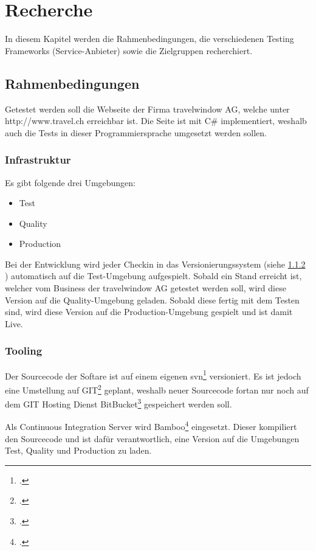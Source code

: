 \chapter{Recherche}

In diesem Kapitel werden die Rahmenbedingungen, die verschiedenen Testing Frameworks (Service-Anbieter) sowie die Zielgruppen recherchiert.

\section{Rahmenbedingungen}
\label{sec:Recherche:Rahmenbedingungen}
Getestet werden soll die Webseite der Firma travelwindow AG, welche unter http://www.travel.ch erreichbar ist. Die Seite ist mit C\# implementiert, weshalb auch die Tests in dieser Programmiersprache umgesetzt werden sollen.

\subsection{Infrastruktur}
\label{sec:Recherche:Rahmenbedingungen:Infrastruktur}
Es gibt folgende drei Umgebungen:
\begin{itemize}
\item Test
\item Quality
\item Production
\end{itemize}
Bei der Entwicklung wird jeder Checkin in das Versionierungssystem (siehe \cref{sec:Recherche:Rahmenbedingungen:Tooling} ) automatisch auf die Test-Umgebung aufgespielt. Sobald ein Stand erreicht ist, welcher vom Business der travelwindow AG getestet werden soll, wird diese Version auf die Quality-Umgebung geladen. Sobald diese fertig mit dem Testen sind, wird diese Version auf die Production-Umgebung gespielt und ist damit Live.

\subsection{Tooling}
\label{sec:Recherche:Rahmenbedingungen:Tooling}
Der Sourcecode der Softare ist auf einem eigenen \gls{svn}\footcite{Apache_Subversion_2015-07-26} versioniert. Es ist jedoch eine Umstellung auf GIT\footcite{Git_2015-07-26} geplant, weshalb neuer Sourcecode fortan nur noch auf dem GIT Hosting Dienst BitBucket\footcite{Git_and_Mercurial_code_management_for_teams_2015-07-26} gespeichert werden soll.

Als Continuous Integration Server wird Bamboo\footcite{Bamboo_2015-07-26} eingesetzt. Dieser kompiliert den Sourcecode und ist dafür verantwortlich, eine Version auf die Umgebungen Test, Quality und Production zu laden.

